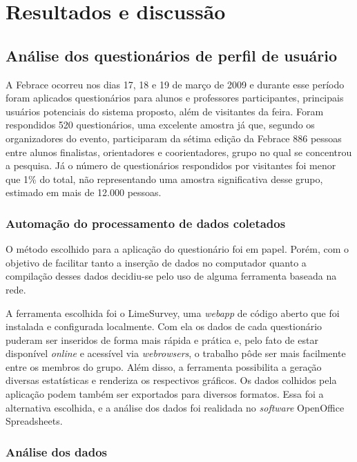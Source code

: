 
\chapter{Resultados e discussão}

\section{Análise dos questionários de perfil de usuário}

    A Febrace ocorreu nos dias 17, 18 e 19 de março de 2009 e durante esse período foram aplicados questionários para alunos e professores participantes, principais usuários potenciais do sistema proposto, além de visitantes da feira. Foram respondidos 520 questionários, uma excelente amostra já que, segundo os organizadores do evento, participaram da sétima edição da Febrace 886 pessoas entre alunos finalistas, orientadores e coorientadores, grupo no qual se concentrou a pesquisa. Já o número de questionários respondidos por visitantes foi menor que 1\% do total, não representando uma amostra significativa desse grupo, estimado em mais de 12.000 pessoas.

  \subsection{Automação do processamento de dados coletados}
    O método escolhido para a aplicação do questionário foi em papel. Porém, com o objetivo de facilitar tanto a inserção de dados no computador quanto a compilação desses dados decidiu-se pelo uso de alguma ferramenta baseada na rede.

    A ferramenta escolhida foi o LimeSurvey, uma \textit{webapp} de código aberto que foi instalada e configurada localmente. Com ela os dados de cada questionário puderam ser inseridos de forma mais rápida e prática e, pelo fato de estar disponível \textit{online} e acessível via \textit{webrowsers}, o trabalho pôde ser mais facilmente entre os membros do grupo. Além disso, a ferramenta possibilita a geração diversas estatísticas e renderiza os respectivos gráficos. Os dados colhidos pela aplicação podem também ser exportados para diversos formatos. Essa foi a alternativa escolhida, e a análise dos dados foi realidada no \textit{software} OpenOffice Spreadsheets.

  \subsection{Análise dos dados}


